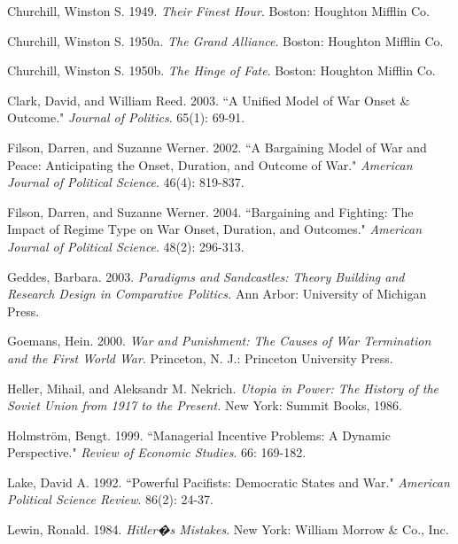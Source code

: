\documentclass[11pt,]{article}
\begin{document}
\begin{thebibliography}{}
\bibitem{} Churchill, Winston S.  1949.  \textit{Their Finest Hour}.  Boston:  Houghton Mifflin Co.

\bibitem{} Churchill, Winston S.  1950a.  \textit{The Grand Alliance}.  Boston:  Houghton Mifflin Co.

\bibitem{} Churchill, Winston S.  1950b.  \textit{The Hinge of Fate}.  Boston:  Houghton Mifflin Co.

\bibitem{} Clark, David, and William Reed.  2003.  ``A Unified Model of War Onset \& Outcome."  \textit{Journal of Politics}.  65(1): 69-91.

\bibitem{} Filson, Darren, and Suzanne Werner.  2002.  ``A Bargaining Model of War and Peace: Anticipating the Onset, Duration, and Outcome of War."  \textit{American Journal of Political Science}.  46(4): 819-837.

\bibitem{} Filson, Darren, and Suzanne Werner.  2004.  ``Bargaining and Fighting: The Impact of Regime Type on War Onset, Duration, and Outcomes."  \textit{American Journal of Political Science}.  48(2): 296-313.

Geddes, Barbara.  2003. \textit{Paradigms and Sandcastles: Theory Building and Research Design in Comparative Politics.} Ann Arbor:  University of Michigan Press.

\bibitem{} Goemans, Hein.  2000.  \textit{War and Punishment: The Causes of War Termination and the First World War}. Princeton, N. J.: Princeton University Press.  

\bibitem{} Heller, Mihail, and Aleksandr M. Nekrich.  \textit{Utopia in Power:  The History of the Soviet Union from 1917 to the Present.}  New York:  Summit Books, 1986.

\bibitem{} Holmstr\"{o}m, Bengt.  1999.  ``Managerial Incentive Problems: A Dynamic Perspective."  \textit{Review of Economic Studies}.  66: 169-182.



\bibitem{} Lake, David A.  1992.  ``Powerful Pacifists: Democratic States and War."  \textit{American Political Science Review}.  86(2): 24-37.

\bibitem{} Lewin, Ronald.  1984.  \textit{Hitler�s Mistakes}.  New York:  William Morrow \& Co., Inc.


\end{thebibliography}
\end{document}
